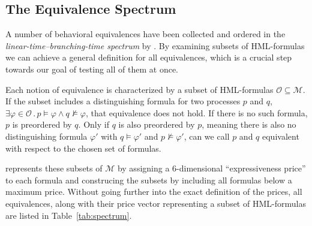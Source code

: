 \subsection{The Equivalence Spectrum}

A number of behavioral equivalences have been collected and ordered
in the \emph{linear-time--branching-time spectrum} %
by \textcite{glabbeek1990spectrum}.
By examining subsets of HML-formulas we can achieve a general definition
for all equivalences,
which is a crucial step towards our goal of testing all of them at once.

Each notion of equivalence is characterized by a subset of HML-formulas
$\mathcal{O} \subseteq \mathcal{M}$.
If the subset includes a distinguishing formula for two processes $p$ and $q$,
$\exists \varphi \in \mathcal{O}\,.\,
    p \models \varphi \wedge q \not\models \varphi$,
that equivalence does not hold.
If there is no such formula, 
$p$ is preordered by $q$.
Only if $q$ is also preordered by $p$,
meaning there is also no distinguishing formula $\varphi'$
with $q \models \varphi'$ and $p \not\models \varphi'$,
can we call $p$ and $q$ equivalent with respect to the chosen set of formulas.

\textcite{bisping2023process} represents these subsets of $\mathcal{M}$
by assigning a 6-dimensional \enquote{expressiveness price} to each formula
and construcing the subsets by including all formulas below a maximum price.
Without going further into the exact definition of the prices,
all equivalences, along with their price vector representing a subset of
HML-formulas are listed in Table~\ref{tab:spectrum}.

